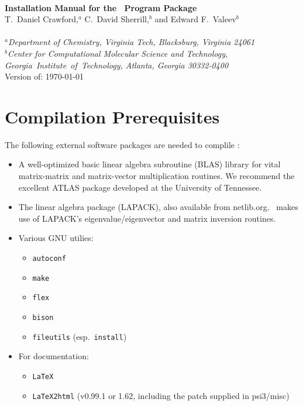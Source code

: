 \documentclass[12pt]{article}
\begin{document}


\begin{center}
\ \\
\vspace{2.0in}
{\bf {\Large Installation Manual for the \PSIthree\ Program Package}} \\
\vspace{0.5in}
T.\ Daniel Crawford,$^a$ C.\ David Sherrill,$^b$ and Edward F.\ Valeev$^b$ \\
\ \\
{\em $^a$Department of Chemistry, Virginia Tech, Blacksburg, Virginia 24061} \\
\vspace{0.1in}
{\em $^b$Center for Computational Molecular Science and Technology, \mbox{Georgia 
Institute of Technology,} Atlanta, Georgia 30332-0400} 
\ \\
\vspace{0.3in}
Version of: \today
\end{center}

\thispagestyle{empty}

\newpage
\section{Compilation Prerequisites}

The following external software packages are needed to complile \PSIthree:
\begin{itemize}
\item A well-optimized basic linear algebra subroutine (BLAS) library
  for vital matrix-matrix and matrix-vector multiplication routines.
  We recommend the excellent ATLAS package developed at the University
  of Tennessee.  
\item The linear algebra package (LAPACK), also available from
  netlib.org.  \PSIthree\ makes use of LAPACK's eigenvalue/eigenvector
  and matrix inversion routines.  
\item Various GNU utilies: 
\begin{itemize}
\item {\tt autoconf}
\item {\tt make}
\item {\tt flex}
\item {\tt bison}
\item {\tt fileutils} (esp.\ {\tt install})
\end{itemize}
\item For documentation:
\begin{itemize}
\item {\tt LaTeX}
\item {\tt LaTeX2html} (v0.99.1 or 1.62, including the patch supplied in
psi3/misc)
\end{itemize}
\end{itemize}
\end{document}
